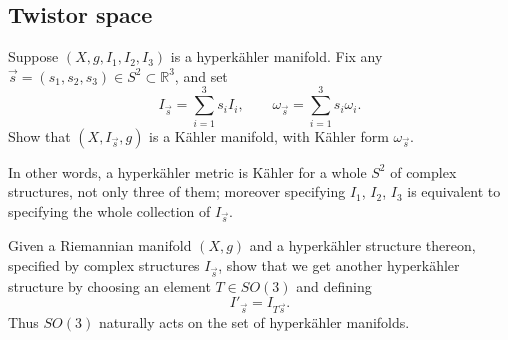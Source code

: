 \documentclass[12pt,letterpaper,reqno]{amsart}
\numberwithin{equation}{section}
\newcommand{\R}{\ensuremath{\mathbb R}}
\newcommand{\kahler}{K\"ahler\xspace}
\newcommand{\hk}{hyperk\"ahler\xspace}
\newcommand{\fixme}[1]{{\color{blue}{[#1]}}}
\begin{document}
\subsection{Twistor space}

\begin{exercise}
Suppose $(X,g,I_1,I_2,I_3)$ is a \hk manifold. Fix any $\vec s = (s_1,s_2,s_3) \in S^2 \subset \R^3$, and set
\begin{equation}
  I_{\vec s} = \sum_{i=1}^3 s_i I_i, \qquad \omega_{\vec s} = \sum_{i=1}^3 s_i \omega_i.
\end{equation}
Show that $(X,I_{\vec s},g)$ is a \kahler manifold,
with \kahler form $\omega_{\vec s}$.
\end{exercise}
In other words, a \hk metric is \kahler for a whole 
$S^2$ of complex structures, not only three of them;
moreover specifying $I_1$, $I_2$, $I_3$ is equivalent to 
specifying the whole collection of $I_{\vec s}$.

\begin{exercise}
Given a Riemannian manifold $(X,g)$ and 
a \hk structure thereon, specified by complex structures
$I_{\vec s}$, show that we get another
\hk structure by choosing an element $T \in SO(3)$
and defining 
\begin{equation}
I'_{\vec s} = I_{T \vec s}.
\end{equation}
Thus $SO(3)$ naturally acts on the set of
\hk manifolds.
\end{exercise}

\fixme{reduced holonomy}

\fixme{Ricci-flatness}

\fixme{twistor family}

\printbibliography
\end{document}
